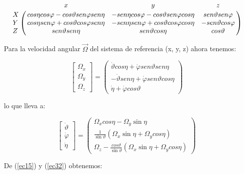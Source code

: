 		\begin{equation}
  		\bordermatrix{ ~ & x & y & z \cr
		X & cos { \eta } cos { \varphi -cos { \vartheta } sen { \varphi } sen { \eta } } & -sen { \eta } cos { \varphi } -cos { \vartheta } sen { \varphi } cos { \eta } & sen { \vartheta } sen { \varphi } \cr
		Y & cos { \eta } sen { \varphi } +cos { \vartheta } cos { \varphi } sen { \eta } & -sen { \eta } sen { \varphi } +cos { \vartheta } cos { \varphi } cos { \eta } & -sen { \vartheta } cos { \varphi } \cr
		Z & sen { \vartheta } sen { \eta } & sen { \vartheta } cos { \eta } & cos { \vartheta }  \cr
		}
		\label{ec33}
		\end{equation}

	Para la velocidad angular $\vec { \Omega  }$  del sistema de referencia (x, y, z) ahora tenemos:

		\begin{equation}
		\begin{bmatrix}
		\Omega_{x} \\
		\Omega_{y} \\
		\Omega_{z}
		\end{bmatrix} =
		\begin{pmatrix}
	    \dot{\vartheta}cos{\eta + \dot{\varphi}sen{\vartheta}sen{\eta}} \\
		-\dot{\vartheta}sen{\eta}+\dot{\varphi}sen{\vartheta}cos{\eta}\\
		\dot{\eta}+\dot{\varphi}cos{\vartheta}
  		\end{pmatrix}
		\label{ec34}
		\end{equation}

		lo que lleva a:

		\begin{equation}
		\begin{bmatrix}
		\dot{\vartheta}\\
		\dot{\varphi}\\
     	\dot{\eta}
		\end{bmatrix} =
		\begin{pmatrix}
		{\Omega}_{x}cos{\eta}-{\Omega}_{y}\sin{\eta}\\
		\frac{1}{\sin{\vartheta}}({\Omega}_{x}\sin{\eta}+{\Omega}_{y}cos{\eta})\\
		{\Omega}_{z}-\frac{cos{\vartheta}}{\sin{\vartheta}}({\Omega}_{x}\sin{\eta}+{\Omega}_{y}cos{\eta})
		\end{pmatrix}
		\label{ec34}
		\end{equation}

	De (\ref{ec15}) y (\ref{ec32})  obtenemos:

